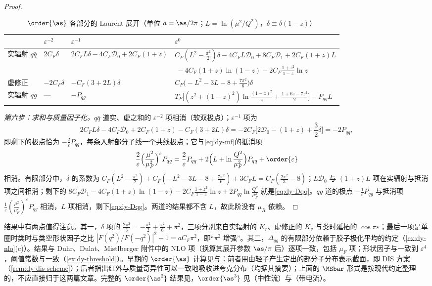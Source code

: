 \begin{proof}
\begin{table}[htbp]
\centering
\caption{$\order{\as}$ 各部分的 Laurent 展开（单位 $a=\as/2\pi$；$L=\ln(\mu^2/Q^2)$，$\delta\equiv\delta(1-z)$）}
\label{tab:dy-laurent}
\footnotesize
\setlength{\tabcolsep}{4pt}
\begin{tabular}{@{}llll@{}}
\toprule
 & $\varepsilon^{-2}$ & $\varepsilon^{-1}$ & $\varepsilon^0$\\
\midrule
实辐射 $q\bar q$ & $2C_F\delta$ & $2C_FL\delta-4C_F\mathcal D_0+2C_F(1+z)$ & $C_F(L^2-\frac{\pi^2}{2})\delta-4C_FL\mathcal D_0+8C_F\mathcal D_1+2C_F(1+z)L$\\
 & & & $\ -4C_F(1+z)\ln(1-z)-2C_F\frac{1+z^2}{1-z}\ln z$\\
虚修正 & $-2C_F\delta$ & $-C_F(3+2L)\delta$ & $C_F\big(-L^2-3L-8+\frac{7\pi^2}{6}\big)\delta$\\
实辐射 $qg$ & --- & $-P_{qg}$ & $T_F\big[(z^2+(1-z)^2)\ln\frac{(1-z)^2}{z}+\frac{1+6z-7z^2}{2}\big]-P_{qg}L$\\
\bottomrule
\end{tabular}
\end{table}

\emph{第六步：求和与质量因子化。}$q\bar q$ 道实、虚之和的 $\varepsilon^{-2}$ 项相消（软双极点）；$\varepsilon^{-1}$ 项为
\[
2C_FL\delta-4C_F\mathcal D_0+2C_F(1+z)-C_F(3+2L)\delta=-2C_F\Big[2\mathcal D_0-(1+z)+\frac32\delta\Big]=-2P_{qq},
\]
即剩下的极点恰为 $-\frac2\varepsilon P_{qq}$，每条入射部分子线一个共线极点；它与\cref{eq:dy-mf}的抵消项
\[
\frac2\varepsilon\Big(\frac{\mu^2}{\mu_F^2}\Big)^{\varepsilon}P_{qq}=\frac2\varepsilon P_{qq}+2\Big(L+\ln\frac{Q^2}{\mu_F^2}\Big)P_{qq}+\order{\varepsilon}
\]
相消。有限部分中，$\delta$ 的系数为 $C_F(L^2-\frac{\pi^2}2)+C_F(-L^2-3L-8+\frac{7\pi^2}6)+3C_FL=C_F(\frac{2\pi^2}3-8)$；$L\mathcal D_0$ 与 $(1+z)L$ 项在实辐射与抵消项之间相消；剩下的 $8C_F\mathcal D_1-4C_F(1+z)\ln(1-z)-2C_F\frac{1+z^2}{1-z}\ln z+2P_{qq}\ln\frac{Q^2}{\mu_F^2}$ 就是\cref{eq:dy-Dqq}。$qg$ 道的极点 $-\frac1\varepsilon P_{qg}$ 与抵消项 $\frac1\varepsilon(\frac{\mu^2}{\mu_F^2})^\varepsilon P_{qg}$ 相消，$L$ 项相消，剩下\cref{eq:dy-Dqg}。两道的结果都不含 $L$，故此阶没有 $\mu_R$ 依赖。
\end{proof}

结果中有两点值得注意。其一，$\delta$ 项的 $\frac{2\pi^2}3=-\frac{\pi^2}2+\frac{\pi^2}6+\pi^2$，三项分别来自实辐射的 $K_r$、虚修正的 $K_v$ 与类时延拓的 $\cos\pi\varepsilon$；最后一项是单圈时类时与类空形状因子之比 $|F(q^2)/F(-q^2)|^2-1=aC_F\pi^2$，即“$\pi^2$ 增强”。其二，$\Delta_{qg}$ 的有限部分依赖于胶子极化平均的约定（\cref{ex:dy-nlo}(c)）。结果与 Duhr、Dulat、Mistlberger 附件中的 NLO 项（换算其展开参数 $\as/\pi$ 后）逐项一致，包括 $\mu_F$ 项\cite{Duhr:2020sdp}；形状因子与\cite{MochVermaserenVogt2005}一致到 $\varepsilon^4$，阈值常数与\cite{Moch:2005ky}一致（\cref{ex:dy-threshold}）。早期的 $\order{\as}$ 计算见\cite{AltarelliEllisMartinelli1979}与\cite{KubarAndrePaige1979}：前者用由轻子产生定出的部分子分布表示截面，即 DIS 方案（\cref{rem:dy-dis-scheme}）；后者指出红外与质量奇异性可以一致地吸收进夸克分布（均据其摘要）；上面的 $\MSbar$ 形式是按现代约定整理的，不应直接归于这两篇文章。完整的 $\order{\as^2}$ 结果见\cite{HambergVanNeervenMatsuura1991}，$\order{\as^3}$ 见\cite{Duhr:2020seh}（中性流）与\cite{Duhr:2020sdp}（带电流）。

